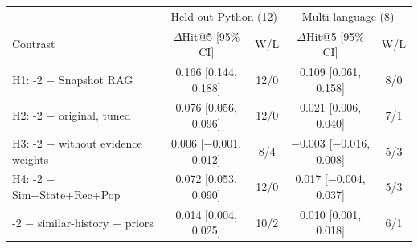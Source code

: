 \begin{tabular}{lcccc}
\toprule
 & \multicolumn{2}{c}{Held-out Python (12)} & \multicolumn{2}{c}{Multi-language (8)} \\
Contrast & $\Delta$Hit@5 [95\% CI] & W/L & $\Delta$Hit@5 [95\% CI] & W/L \\
\midrule
H1: \sys{}-2 $-$ Snapshot RAG & 0.166 [0.144, 0.188] & 12/0 & 0.109 [0.061, 0.158] & 8/0 \\
H2: \sys{}-2 $-$ original, tuned & 0.076 [0.056, 0.096] & 12/0 & 0.021 [0.006, 0.040] & 7/1 \\
H3: \sys{}-2 $-$ without evidence weights & 0.006 [$-$0.001, 0.012] & 8/4 & $-$0.003 [$-$0.016, 0.008] & 5/3 \\
H4: \sys{}-2 $-$ Sim+State+Rec+Pop & 0.072 [0.053, 0.090] & 12/0 & 0.017 [$-$0.004, 0.037] & 5/3 \\
\sys{}-2 $-$ similar-history + priors & 0.014 [0.004, 0.025] & 10/2 & 0.010 [0.001, 0.018] & 6/1 \\
\bottomrule
\end{tabular}